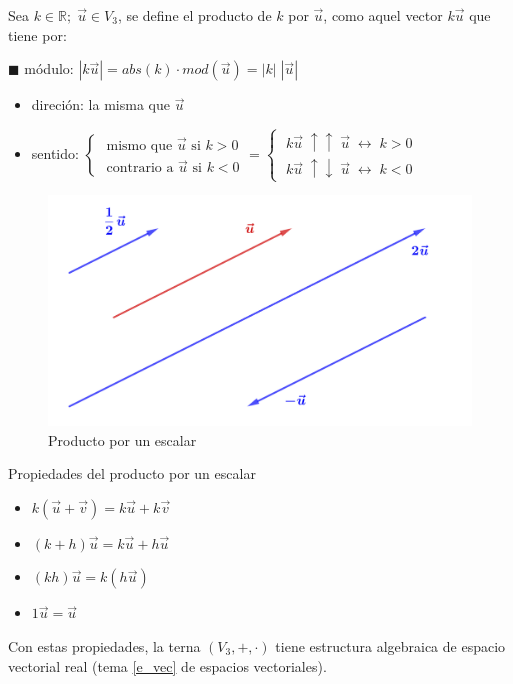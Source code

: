 \begin{defi}

Sea $k\in \mathbb R; \; \vec u \in V_3$, se define el producto de $k$ por $\vec u$, como aquel vector $k \vec u$ que tiene por:

\tiny{$\blacksquare$} \normalsize{módulo}: $|k\vec u|= abs(k) \cdot mod(\vec u)=|k|\;|\vec u|$
\begin{multicols}{2}
\begin{itemize}
\item direción: la misma que $\vec u$
\item sentido: $\begin{cases} \text{ mismo que } \vec u \text{ si } k>0\\ \text{ contrario a } \vec u \text{ si } k<0	\end{cases} = \begin{cases} \; k\vec u \; \uparrow \uparrow \; \vec u \; \leftrightarrow \; k>0 \\ \; k\vec u \; \uparrow \downarrow \; \vec u \; \leftrightarrow \; k<0 \end{cases}$
\end{itemize}

\begin{figure}[H]
	\centering
	\includegraphics[width=.4\textwidth]{imagenes/imagenes09/T09IM04.png}
	\caption*{Producto por un escalar}
\end{figure}
\end{multicols}
	
\end{defi}

\begin{prop}{Propiedades del producto por un escalar}
\begin{multicols}{2}
\begin{itemize}
\item $k(\vec u + \vec v)=k \vec u + k \vec v$
\item $(k+h)\vec u=k\vec u + h\vec u$	
\item $(kh)\vec u=k(h\vec u)$
\item $1\vec u=\vec u$
\end{itemize}
\end{multicols}	
\textcolor{gris}{\normalsize{Con} estas propiedades, la terna $(V_3,+,\cdot)$ tiene estructura algebraica de espacio vectorial real (tema \ref{e_vec} de espacios vectoriales).}
\end{prop}

